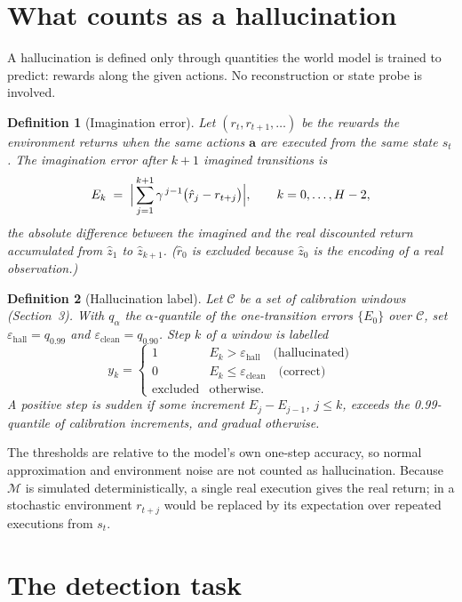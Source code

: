 \documentclass[11pt]{article}
\newtheorem{definition}{Definition}
\begin{document}
\section{What counts as a hallucination}

A hallucination is defined only through quantities the world model is trained to predict: rewards along the given
actions. No reconstruction or state probe is involved.

\begin{definition}[Imagination error]
Let $(r_{t},r_{t+1},\dots)$ be the rewards the environment returns when the \emph{same} actions $\mathbf a$ are
executed from the \emph{same} state $s_t$. The imagination error after $k+1$ imagined transitions is
\[
E_k \;=\; \Bigl|\,\sum_{j=1}^{k+1}\gamma^{\,j-1}\bigl(\hat r_j - r_{t+j}\bigr)\Bigr|,\qquad k=0,\dots,H-2,
\]
the absolute difference between the imagined and the real discounted return accumulated from $\hat z_1$ to
$\hat z_{k+1}$. ($\hat r_0$ is excluded because $\hat z_0$ is the encoding of a real observation.)
\end{definition}

\begin{definition}[Hallucination label]
Let $\mathcal{C}$ be a set of calibration windows (Section~3). With $q_\alpha$ the $\alpha$-quantile of the
one-transition errors $\{E_0\}$ over $\mathcal{C}$, set $\varepsilon_{\text{hall}}=q_{0.99}$ and
$\varepsilon_{\text{clean}}=q_{0.90}$. Step $k$ of a window is labelled
\[
y_k=\begin{cases}1 & E_k>\varepsilon_{\text{hall}} \quad\text{(hallucinated)}\\
0 & E_k\le\varepsilon_{\text{clean}} \quad\text{(correct)}\\
\text{excluded} & \text{otherwise.}\end{cases}
\]
A positive step is \emph{sudden} if some increment $E_j-E_{j-1}$, $j\le k$, exceeds the 0.99-quantile of calibration
increments, and \emph{gradual} otherwise.
\end{definition}

The thresholds are relative to the model's own one-step accuracy, so normal approximation and environment noise
are not counted as hallucination. Because $\mathcal{M}$ is simulated deterministically, a single real execution
gives the real return; in a stochastic environment $r_{t+j}$ would be replaced by its expectation over repeated
executions from $s_t$.

\section{The detection task}
\end{document}
